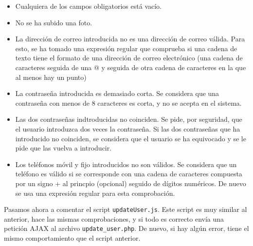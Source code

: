 \documentclass[11pt]{article}
\theoremstyle{plain}
\theoremstyle{definition}
\begin{document}
\begin{itemize}
\item Cualquiera de los campos obligatorios está vacío.
\item No se ha subido una foto.
\item La dirección de correo introducida no es una dirección de correo
  válida. Para esto, se ha tomado una expresión regular que comprueba
  si una cadena de texto tiene el formato de una dirección de correo
  electrónico (una cadena de caracteres seguida de una @ y seguida de
  otra cadena de caracteres en la que al menos hay un punto)
\item La contraseña introducida es demasiado corta. Se considera que
  una contraseña con menos de 8 caracteres es corta, y no se acepta en
  el sistema.
\item Las dos contraseñas indtroducidas no coinciden. Se pide, por
  seguridad, que el usuario introduzca dos veces la contraseña. Si las
  dos contraseñas que ha introducido no coinciden, se considera que el
  usuario se ha equivocado y se le pide que las vuelva a introducir.
\item Los teléfonos móvil y fijo introducidos no son válidos. Se
  considera que un teléfono es válido si se corresponde con una cadena
  de caracteres compuesta por un signo + al princpio (opcional)
  seguido de dígitos numéricos. De nuevo se usa una expresión regular
  para esta comprobación.
\end{itemize}

Pasamos ahora a comentar el script \texttt{updateUser.js}. Este script
es muy similar al anterior, hace las mismas comprobaciones, y si todo
es correcto envía una petición AJAX al archivo
\texttt{update\_user.php}.  De nuevo, si hay algún error, tiene el
mismo comportamiento que el script
anterior.\\
\end{document}
